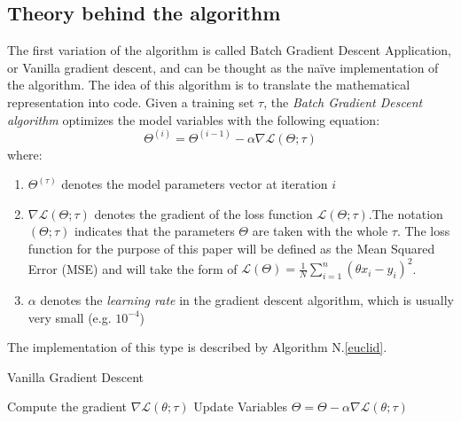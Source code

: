 \documentclass[conference]{IEEEtran}
\begin{document}
\subsection{Theory behind the algorithm}
The first variation of the algorithm is called Batch Gradient Descent Application, or Vanilla gradient descent, and can be thought as the naïve implementation of the algorithm\cite{JZ2019}. 
The idea of this algorithm is to translate the mathematical representation into code. 
Given a training set $\tau$, the \textit{Batch Gradient Descent algorithm} optimizes the model variables with the following equation:
\begin{equation}
    \Theta^{(i)} = \Theta^{(i-1)} -\alpha\nabla\mathscr{L}(\Theta;\tau)\label{BGDA}
\end{equation}
where:
\begin{enumerate}
  \item $\Theta^{(\tau)}$ denotes the model parameters vector at iteration $i$
  \item $\nabla\mathscr{L}(\Theta;\tau)$ denotes the gradient of the loss function $\mathscr{L}(\Theta;\tau)$.The notation $(\Theta;\tau)$ indicates that the parameters $\Theta$ are taken with the whole $\tau$. The loss function for the purpose of this paper will be defined as the Mean Squared Error (MSE) and will take the form of $\mathscr{L}(\Theta)= \frac{1}{N}\sum_{i=1}^{n}(\theta x_i - y_i)^2$.
  \item $\alpha$ denotes the  \textit{learning rate} in the gradient descent algorithm, which is usually very small (e.g. $10^{-4}$)
\end{enumerate}

The implementation of this type is described by Algorithm N.\ref{euclid}.

\begin{algorithm}
\caption{Vanilla Gradient Descent}\label{euclid}
\begin{algorithmic}[1]
\State Compute the gradient $\nabla\mathscr{L}(\theta;\tau)$
\State Update Variables $\Theta = \Theta -\alpha\nabla\mathscr{L}(\theta;\tau)$
\EndFor
\State {} 
\end{algorithmic}
\end{algorithm}
\end{document}
